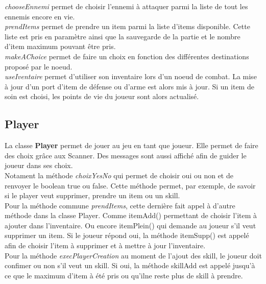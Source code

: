 		\textit{chooseEnnemi} permet de choisir l'ennemi à attaquer parmi la liste de tout les ennemis encore en vie.\\

		\textit{prendItems} permet de prendre un item parmi la liste d'items disponible. Cette liste est pris en paramètre ainsi que la sauvegarde de la partie et le nombre d'item maximum pouvant être pris.\\

		\textit{makeAChoice} permet de faire un choix en fonction des différentes destinations proposé par le noeud.\\

		\textit{useIventaire} permet d'utiliser son inventaire lors d'un noeud de combat. La mise à jour d'un port d'item de défense ou d'arme est alors mis à jour. Si un item de soin est choisi, les points de vie du joueur sont alors actualisé.\\

	\subsection{Player}
		La classe \textbf{Player} permet de jouer au jeu en tant que joueur. Elle permet de faire des choix grâce aux Scanner. Des messages sont aussi affiché afin de guider le joueur dans ses choix.\\
		Notament la méthode \textit{choixYesNo} qui permet de choisir oui ou non et de renvoyer le boolean true ou false. Cette méthode permet, par exemple, de savoir si le player veut supprimer, prendre un item ou un skill.\\
		Pour la méthode commune \textit{prendItems}, cette dernière fait appel à d'autre méthode dans la classe Player. Comme itemAdd() permettant de choisir l'item à ajouter dans l'inventaire. Ou encore itemPlein() qui demande au joueur s'il veut supprimer un item. Si le joueur répond oui, la méthode itemSupp() est appelé afin de choisir l'item à supprimer et à mettre à jour l'inventaire.\\
		Pour la méthode \textit{execPlayerCreation} au moment de l'ajout des skill, le joueur doit confimer ou non s'il veut un skill. Si oui, la méthode skillAdd est appelé jusqu'à ce que le maximum d'item à été pris ou qu'ilne reste plus de skill à prendre.\\

